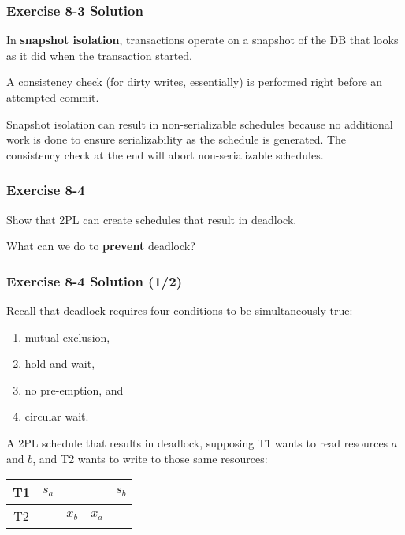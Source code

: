 \begin{frame}
\frametitle{Exercise 8-3 Solution}

In \textbf{snapshot isolation}, transactions operate on a snapshot of the DB that looks as it did when the transaction started.

A consistency check (for dirty writes, essentially) is performed right before an attempted commit.

Snapshot isolation can result in non-serializable schedules because no additional work is done to ensure serializability as the schedule is generated. The consistency check at the end will abort non-serializable schedules.

\end{frame}


\begin{frame}
\frametitle{Exercise 8-4}

Show that 2PL can create schedules that result in deadlock.

What can we do to \textbf{prevent} deadlock?

\end{frame}


\begin{frame}
\frametitle{Exercise 8-4 Solution (1/2)}

Recall that deadlock requires four conditions to be simultaneously true:

\begin{enumerate}
  \item mutual exclusion,
  \item hold-and-wait,
  \item no pre-emption, and
  \item circular wait.
\end{enumerate}

A 2PL schedule that results in deadlock, supposing T1 wants to read resources $a$ and $b$, and T2 wants to write to those same resources:

\begin{center}
\begin{tabular}{ c c c c c }
  \hline
  T1 & $s_a$ &      &      & $s_b$ \\
  \hline
  T2 &      & $x_b$ & $x_a$ &      \\
  \hline
\end{tabular}
\end{center}

\end{frame}


